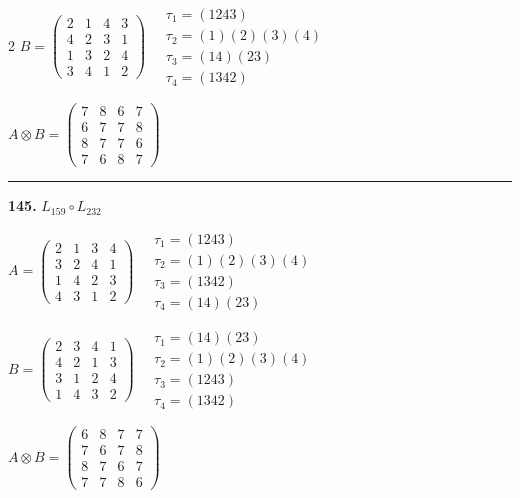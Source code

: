 \begin{multicols}{2}
$B = \begin{pmatrix} 2 & 1 & 4 & 3 \\ 4 & 2 & 3 & 1 \\ 1 & 3 & 2 & 4 \\ 3 & 4 & 1 & 2 \end{pmatrix} \quad \begin{matrix} \tau_{1}=(1 2 4 3) \\ \tau_{2}=(1)(2)(3)(4) \\ \tau_{3}=(1 4)(2 3) \\ \tau_{4}=(1 3 4 2) \end{matrix}$

$A \otimes B = \begin{pmatrix} 7 & 8 & 6 & 7 \\ 6 & 7 & 7 & 8 \\ 8 & 7 & 7 & 6 \\ 7 & 6 & 8 & 7 \end{pmatrix}$

\vspace{0.3em}
\hrule
\vspace{0.3em}

\noindent\textbf{145.} $L_{159} \circ L_{232}$

$A = \begin{pmatrix} 2 & 1 & 3 & 4 \\ 3 & 2 & 4 & 1 \\ 1 & 4 & 2 & 3 \\ 4 & 3 & 1 & 2 \end{pmatrix} \quad \begin{matrix} \tau_{1}=(1 2 4 3) \\ \tau_{2}=(1)(2)(3)(4) \\ \tau_{3}=(1 3 4 2) \\ \tau_{4}=(1 4)(2 3) \end{matrix}$

$B = \begin{pmatrix} 2 & 3 & 4 & 1 \\ 4 & 2 & 1 & 3 \\ 3 & 1 & 2 & 4 \\ 1 & 4 & 3 & 2 \end{pmatrix} \quad \begin{matrix} \tau_{1}=(1 4)(2 3) \\ \tau_{2}=(1)(2)(3)(4) \\ \tau_{3}=(1 2 4 3) \\ \tau_{4}=(1 3 4 2) \end{matrix}$

$A \otimes B = \begin{pmatrix} 6 & 8 & 7 & 7 \\ 7 & 6 & 7 & 8 \\ 8 & 7 & 6 & 7 \\ 7 & 7 & 8 & 6 \end{pmatrix}$


\end{multicols}
